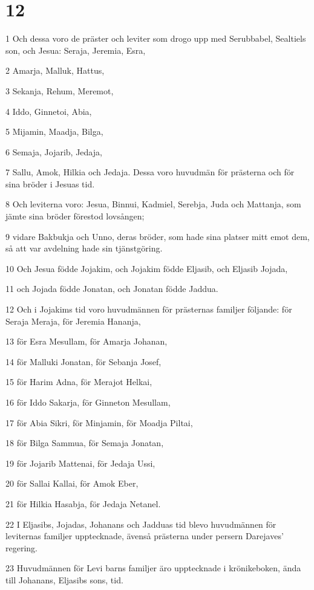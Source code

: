 \chapter{12}

\par 1 Och dessa voro de präster och leviter som drogo upp med Serubbabel, Sealtiels son, och Jesua: Seraja, Jeremia, Esra,
\par 2 Amarja, Malluk, Hattus,
\par 3 Sekanja, Rehum, Meremot,
\par 4 Iddo, Ginnetoi, Abia,
\par 5 Mijamin, Maadja, Bilga,
\par 6 Semaja, Jojarib, Jedaja,
\par 7 Sallu, Amok, Hilkia och Jedaja. Dessa voro huvudmän för prästerna och för sina bröder i Jesuas tid.
\par 8 Och leviterna voro: Jesua, Binnui, Kadmiel, Serebja, Juda och Mattanja, som jämte sina bröder förestod lovsången;
\par 9 vidare Bakbukja och Unno, deras bröder, som hade sina platser mitt emot dem, så att var avdelning hade sin tjänstgöring.
\par 10 Och Jesua födde Jojakim, och Jojakim födde Eljasib, och Eljasib Jojada,
\par 11 och Jojada födde Jonatan, och Jonatan födde Jaddua.
\par 12 Och i Jojakims tid voro huvudmännen för prästernas familjer följande: för Seraja Meraja, för Jeremia Hananja,
\par 13 för Esra Mesullam, för Amarja Johanan,
\par 14 för Malluki Jonatan, för Sebanja Josef,
\par 15 för Harim Adna, för Merajot Helkai,
\par 16 för Iddo Sakarja, för Ginneton Mesullam,
\par 17 för Abia Sikri, för Minjamin, för Moadja Piltai,
\par 18 för Bilga Sammua, för Semaja Jonatan,
\par 19 för Jojarib Mattenai, för Jedaja Ussi,
\par 20 för Sallai Kallai, för Amok Eber,
\par 21 för Hilkia Hasabja, för Jedaja Netanel.
\par 22 I Eljasibs, Jojadas, Johanans och Jadduas tid blevo huvudmännen för leviternas familjer upptecknade, ävenså prästerna under persern Darejaves' regering.
\par 23 Huvudmännen för Levi barns familjer äro upptecknade i krönikeboken, ända till Johanans, Eljasibs sons, tid.
